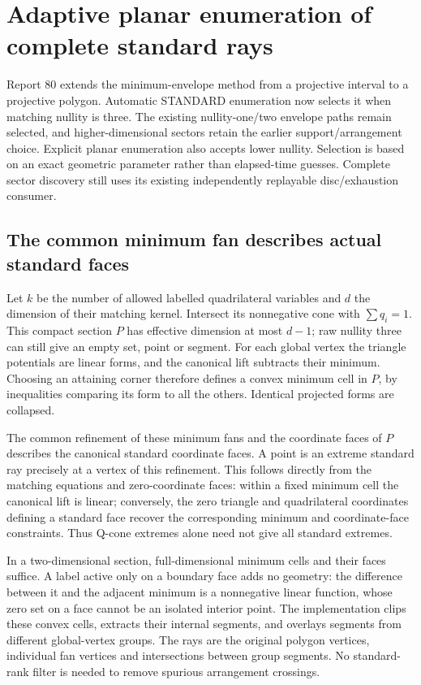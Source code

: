 \section{Adaptive planar enumeration of complete standard rays}
\label{sec:planar-sectors-native}

Report 80 extends the minimum-envelope method from a projective interval
to a projective polygon. Automatic STANDARD enumeration now selects it
when matching nullity is three. The existing nullity-one/two envelope
paths remain selected, and higher-dimensional sectors retain the earlier
support/arrangement choice. Explicit planar enumeration also accepts
lower nullity. Selection is based on an exact geometric parameter rather
than elapsed-time guesses. Complete sector discovery still uses its
existing independently replayable disc/exhaustion consumer.

\subsection{The common minimum fan describes actual standard faces}

Let $k$ be the number of allowed labelled quadrilateral variables and $d$
the dimension of their matching kernel. Intersect its nonnegative cone
with $\sum q_i=1$. This compact section $P$ has effective dimension at most
$d-1$; raw nullity three can still give an empty set, point or segment.
For each global vertex the triangle potentials are linear forms, and the
canonical lift subtracts their minimum. Choosing an attaining corner
therefore defines a convex minimum cell in $P$, by inequalities comparing
its form to all the others. Identical projected forms are collapsed.

The common refinement of these minimum fans and the coordinate faces of
$P$ describes the canonical standard coordinate faces. A point is an
extreme standard ray precisely at a vertex of this refinement. This
follows directly from the matching equations and zero-coordinate faces:
within a fixed minimum cell the canonical lift is linear; conversely,
the zero triangle and quadrilateral coordinates defining a standard face
recover the corresponding minimum and coordinate-face constraints.
Thus Q-cone extremes alone need not give all standard extremes.

In a two-dimensional section, full-dimensional minimum cells and their
faces suffice. A label active only on a boundary face adds no geometry:
the difference between it and the adjacent minimum is a nonnegative linear
function, whose zero set on a face cannot be an isolated interior point.
The implementation clips these convex cells, extracts their internal
segments, and overlays segments from different global-vertex groups.
The rays are the original polygon vertices, individual fan vertices and
intersections between group segments. No standard-rank filter is needed
to remove spurious arrangement crossings.

